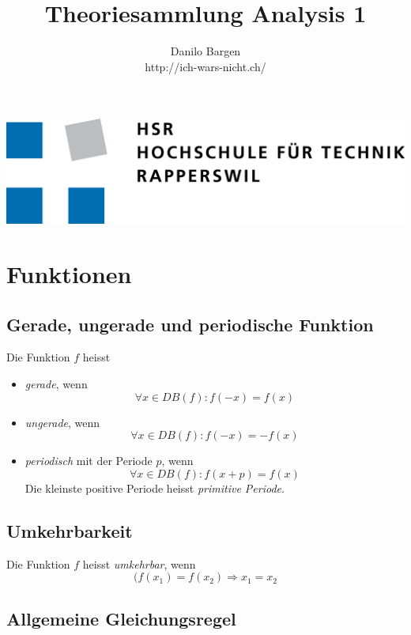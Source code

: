 \documentclass[10pt,a4paper]{article}
\author{Danilo Bargen\\http://ich-wars-nicht.ch/}
\title{Theoriesammlung Analysis 1}
\begin{document}
\begin{titlepage}
	\maketitle
	\vspace{120mm}
	\center\includegraphics{hsr_logo.png}
	\thispagestyle{empty} %
\end{titlepage}

\tableofcontents\newpage

\section{Funktionen}

\subsection{Gerade, ungerade und periodische Funktion}

Die Funktion $f$ heisst

\begin{itemize}
\item \textit{gerade}, wenn
$$\forall x \in DB(f): f(-x) = f(x)$$
\item \textit{ungerade}, wenn
$$\forall x \in DB(f): f(-x) = -f(x)$$
\item \textit{periodisch} mit der Periode $p$, wenn
$$\forall x \in DB(f): f(x + p) = f(x)$$
Die kleinste positive Periode heisst \textit{primitive Periode}.
\end{itemize}


\subsection{Umkehrbarkeit}

Die Funktion $f$ heisst \textit{umkehrbar}, wenn
$$(f(x_1) = f(x_2) \Rightarrow x_1 = x_2$$

\subsection{Allgemeine Gleichungsregel}
\end{document}
